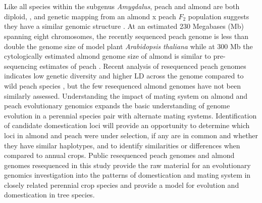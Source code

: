 \documentclass[12pt]{article}
\begin{document}
%
\\
\\
%
Like all species within the subgenus \emph{Amygdalus}, peach and almond are both diploid, , and genetic mapping from an almond x peach $F_2$ population suggests they have a similar genomic structure \citep{dirlewanger2004comparative}. 
%
At an estimated 230 Megabases (Mb) spanning eight chromosomes, the recently sequenced peach genome \citep{verde2013high} is less than double the genome size of model plant \emph{Arabidopsis thaliana} while at 300 Mb the cytologically estimated almond genome size of almond is similar to pre-sequencing estimates of peach \citep{arumuganathan1991nuclear}. 
%
%
%
Recent analysis of resequenced peach genomes indicates low genetic diversity and higher LD across the genome compared to wild peach species \citep{verde2013high}, but the few resequenced almond genomes have not been similarly assessed. 
%
%
%
Understanding the impact of mating system on almond and peach evolutionary genomics expands the basic understanding of genome evolution in a perennial species pair with alternate mating systems. 
%
Identification of candidate domestication loci will provide an opportunity to determine which loci in almond and peach were under selection, if any are in common and whether they have similar haplotypes, and to identify similarities or differences when compared to annual crops. 
%
%
%
Public resequenced peach genomes and almond genomes resequenced in this study provide the raw material for an evolutionary genomics investigation into the patterns of domestication and mating system in closely related perennial crop species and provide a model for evolution and domestication in tree species.
%
\\
\end{document}
